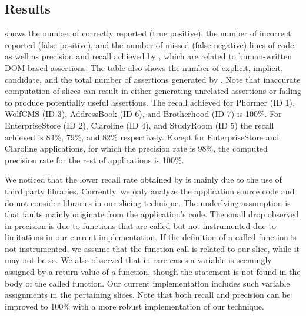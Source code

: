 \subsection{Results} \label{Sec:results}
 shows the number of  correctly reported (true positive), the number of incorrect reported (false positive), and the number of missed (false negative) \javascript lines of code, as well as precision and recall achieved by \tool, which are related to human-written DOM-based assertions. The table also shows the number of explicit, implicit, candidate, and the total number of assertions generated by \tool. 
Note that inaccurate computation of slices can result in either generating unrelated assertions or failing to produce potentially useful assertions.
The recall achieved for Phormer (ID 1), WolfCMS (ID 3), AddressBook (ID 6), and Brotherhood (ID 7) is 100\%. For EnterpriseStore (ID 2), Claroline (ID 4), and StudyRoom (ID 5) the recall achieved is 84\%, 79\%, and 82\% respectively. Except for EnterpriseStore and Claroline applications, for which the precision rate is 98\%, the computed precision rate for the rest of applications is 100\%.

We noticed that the lower recall rate obtained by \tool is mainly due to the use of third party libraries. Currently, we only analyze the application source code and do not consider libraries in our slicing technique. The underlying assumption is that faults mainly originate from the application's code. The small drop observed in precision is due to functions that are called but not instrumented due to limitations in our current implementation. If the definition of a called function is not instrumented, we assume that the function call is related to our slice, while it may not be so. 
We also observed that in rare cases a variable is seemingly assigned by a return value of a function, though the  statement is not found in the body of the called function. Our current implementation includes such variable assignments in the pertaining slices. 
Note that both recall and precision can be improved to 100\% with a more robust implementation of our technique. 

